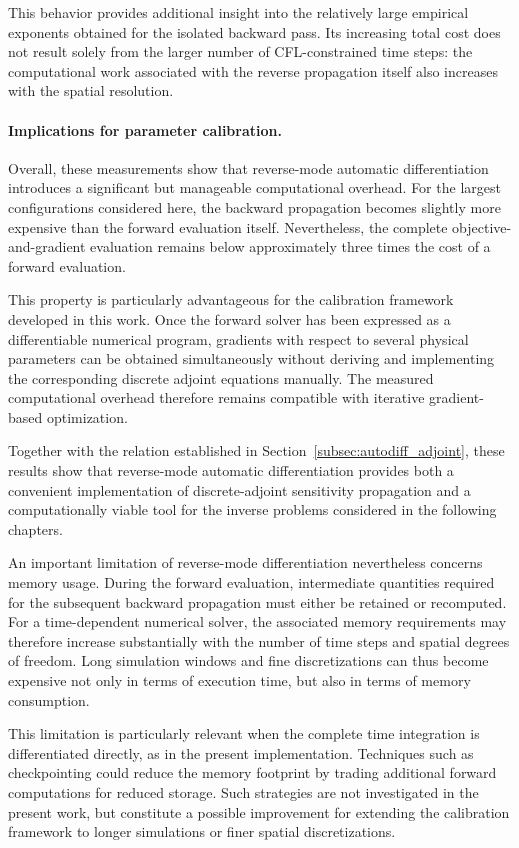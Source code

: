 \documentclass[11pt,a4paper]{report}
\theoremstyle{plain}
\theoremstyle{definition}
\begin{document}
This behavior provides additional insight into the relatively large empirical
exponents obtained for the isolated backward pass. Its increasing total cost
does not result solely from the larger number of CFL-constrained time steps:
the computational work associated with the reverse propagation itself also
increases with the spatial resolution.

\paragraph{Implications for parameter calibration.}

Overall, these measurements show that reverse-mode automatic differentiation
introduces a significant but manageable computational overhead. For the
largest configurations considered here, the backward propagation becomes
slightly more expensive than the forward evaluation itself. Nevertheless, the
complete objective-and-gradient evaluation remains below approximately three
times the cost of a forward evaluation.

This property is particularly advantageous for the calibration framework
developed in this work. Once the forward solver has been expressed as a
differentiable numerical program, gradients with respect to several physical
parameters can be obtained simultaneously without deriving and implementing
the corresponding discrete adjoint equations manually. The measured
computational overhead therefore remains compatible with iterative
gradient-based optimization.

Together with the relation established in
Section~\ref{subsec:autodiff_adjoint}, these results show that reverse-mode
automatic differentiation provides both a convenient implementation of
discrete-adjoint sensitivity propagation and a computationally viable tool for
the inverse problems considered in the following chapters.

An important limitation of reverse-mode differentiation nevertheless concerns
memory usage. During the forward evaluation, intermediate quantities required
for the subsequent backward propagation must either be retained or recomputed.
For a time-dependent numerical solver, the associated memory requirements may
therefore increase substantially with the number of time steps and spatial
degrees of freedom. Long simulation windows and fine discretizations can thus
become expensive not only in terms of execution time, but also in terms of
memory consumption.

This limitation is particularly relevant when the complete time integration is
differentiated directly, as in the present implementation. Techniques such as
checkpointing could reduce the memory footprint by trading additional forward
computations for reduced storage. Such strategies are not investigated in the
present work, but constitute a possible improvement for extending the
calibration framework to longer simulations or finer spatial discretizations.
\end{document}
